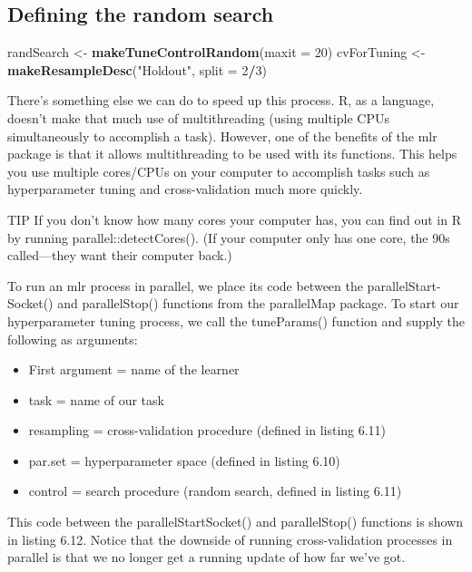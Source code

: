 \documentclass[
]{article}
\newenvironment{Shaded}{\begin{snugshade}}{\end{snugshade}}
\newcommand{\AttributeTok}[1]{\textcolor[rgb]{0.13,0.29,0.53}{#1}}
\newcommand{\DecValTok}[1]{\textcolor[rgb]{0.00,0.00,0.81}{#1}}
\newcommand{\FunctionTok}[1]{\textcolor[rgb]{0.13,0.29,0.53}{\textbf{#1}}}
\newcommand{\NormalTok}[1]{#1}
\newcommand{\OtherTok}[1]{\textcolor[rgb]{0.56,0.35,0.01}{#1}}
\newcommand{\SpecialCharTok}[1]{\textcolor[rgb]{0.81,0.36,0.00}{\textbf{#1}}}
\newcommand{\StringTok}[1]{\textcolor[rgb]{0.31,0.60,0.02}{#1}}
\providecommand{\tightlist}{%
  \setlength{\itemsep}{0pt}\setlength{\parskip}{0pt}}
\begin{document}
\subsection{Defining the random
search}\label{defining-the-random-search}

\begin{Shaded}
\begin{Highlighting}[]
\NormalTok{randSearch }\OtherTok{\textless{}{-}} \FunctionTok{makeTuneControlRandom}\NormalTok{(}\AttributeTok{maxit =} \DecValTok{20}\NormalTok{)}
\NormalTok{cvForTuning }\OtherTok{\textless{}{-}} \FunctionTok{makeResampleDesc}\NormalTok{(}\StringTok{"Holdout"}\NormalTok{, }\AttributeTok{split =} \DecValTok{2}\SpecialCharTok{/}\DecValTok{3}\NormalTok{)}
\end{Highlighting}
\end{Shaded}

There's something else we can do to speed up this process. R, as a
language, doesn't make that much use of multithreading (using multiple
CPUs simultaneously to accomplish a task). However, one of the benefits
of the mlr package is that it allows multithreading to be used with its
functions. This helps you use multiple cores/CPUs on your computer to
accomplish tasks such as hyperparameter tuning and cross-validation much
more quickly.

TIP If you don't know how many cores your computer has, you can find out
in R by running parallel::detectCores(). (If your computer only has one
core, the 90s called---they want their computer back.)

To run an mlr process in parallel, we place its code between the
parallelStart-Socket() and parallelStop() functions from the parallelMap
package. To start our hyperparameter tuning process, we call the
tuneParams() function and supply the following as arguments:

\begin{itemize}
\tightlist
\item
  First argument = name of the learner
\item
  task = name of our task
\item
  resampling = cross-validation procedure (defined in listing 6.11)
\item
  par.set = hyperparameter space (defined in listing 6.10)
\item
  control = search procedure (random search, defined in listing 6.11)
\end{itemize}

This code between the parallelStartSocket() and parallelStop() functions
is shown in listing 6.12. Notice that the downside of running
cross-validation processes in parallel is that we no longer get a
running update of how far we've got.
\end{document}
